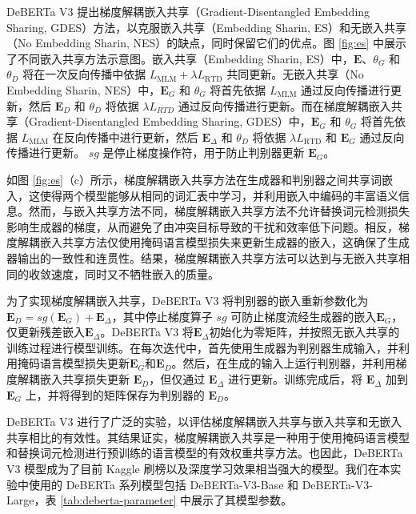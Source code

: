 DeBERTa V3 提出梯度解耦嵌入共享（Gradient-Disentangled Embedding Sharing, GDES）方法，以克服嵌入共享（Embedding Sharin, ES）和无嵌入共享（No Embedding Sharin, NES）的缺点，同时保留它们的优点。图 \ref{fig:es} 中展示了不同嵌入共享方法示意图。嵌入共享（Embedding Sharin, ES）中，$\mathbf{E}$、$\theta _ G$ 和 $\theta _ D$ 将在一次反向传播中依据 $L _ {\text{MLM}} + \lambda L _ {\text{RTD}}$ 共同更新。无嵌入共享（No Embedding Sharin, NES）中，$\mathbf{E}_{G}$ 和 $\theta _ G$ 将首先依据 $L_{\text{MLM}}$ 通过反向传播进行更新，然后 $\mathbf E_{D}$ 和 $\theta _ D$ 将依据 $\lambda L _ {RTD}$ 通过反向传播进行更新。而在梯度解耦嵌入共享（Gradient-Disentangled Embedding Sharing, GDES）中，$\mathbf E _ {G}$ 和 $\theta _ G$ 将首先依据 $L_{\text{MLM}}$ 在反向传播中进行更新，然后 $\mathbf E_{\Delta}$ 和 $\theta _ D$ 将依据 $\lambda L _ {\text{RTD}}$ 和 $\mathbf E_{G}$ 通过反向传播进行更新。 $sg$ 是停止梯度操作符，用于防止判别器更新 $\mathbf E _ G$。

如图 \ref{fig:es}（c）所示，梯度解耦嵌入共享方法在生成器和判别器之间共享词嵌入，这使得两个模型能够从相同的词汇表中学习，并利用嵌入中编码的丰富语义信息。然而，与嵌入共享方法不同，梯度解耦嵌入共享方法不允许替换词元检测损失影响生成器的梯度，从而避免了由冲突目标导致的干扰和效率低下问题。相反，梯度解耦嵌入共享方法仅使用掩码语言模型损失来更新生成器的嵌入，这确保了生成器输出的一致性和连贯性。结果，梯度解耦嵌入共享方法可以达到与无嵌入共享相同的收敛速度，同时又不牺牲嵌入的质量。

为了实现梯度解耦嵌入共享，DeBERTa V3 将判别器的嵌入重新参数化为 $\mathbf{E}_D = sg(\mathbf{E}_G) + \mathbf E_{\Delta}$，其中停止梯度算子 $sg$ 可防止梯度流经生成器的嵌入$\mathbf E_G$，仅更新残差嵌入$\mathbf E_{\Delta}$。DeBERTa V3 将$\mathbf E_{\Delta}$初始化为零矩阵，并按照无嵌入共享的训练过程进行模型训练。在每次迭代中，首先使用生成器为判别器生成输入，并利用掩码语言模型损失更新$\mathbf E_G$和$\mathbf E_D$。然后，在生成的输入上运行判别器，并利用梯度解耦嵌入共享损失更新 $\mathbf E_D$，但仅通过 $\mathbf E_{\Delta}$ 进行更新。训练完成后，将 $\mathbf E_{\Delta}$ 加到 $\mathbf E_G$ 上，并将得到的矩阵保存为判别器的 $\mathbf E_D$。

DeBERTa V3 进行了广泛的实验，以评估梯度解耦嵌入共享与嵌入共享和无嵌入共享相比的有效性。其结果证实，梯度解耦嵌入共享是一种用于使用掩码语言模型和替换词元检测进行预训练的语言模型的有效权重共享方法。也因此，DeBERTa V3 模型成为了目前 Kaggle 刷榜以及深度学习效果相当强大的模型。我们在本实验中使用的 DeBERTa 系列模型包括 DeBERTa-V3-Base 和 DeBERTa-V3-Large，表 \ref{tab:deberta-parameter} 中展示了其模型参数。

